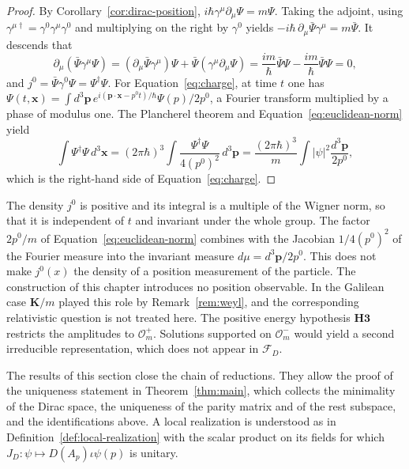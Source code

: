 \begin{proof}
	By Corollary~\ref{cor:dirac-position}, $i\hbar\gamma^\mu\partial_\mu\Psi=m\Psi$. Taking the adjoint, using $\gamma^{\mu\dagger}=\gamma^0\gamma^\mu\gamma^0$ and multiplying on the right by $\gamma^0$ yields $-i\hbar\,\partial_\mu\bar{\Psi}\gamma^\mu=m\bar{\Psi}$. It descends that
	\begin{equation*}
		\partial_\mu(\bar{\Psi}\gamma^\mu\Psi)=(\partial_\mu\bar{\Psi}\gamma^\mu)\Psi+\bar{\Psi}(\gamma^\mu\partial_\mu\Psi)=\frac{im}{\hbar}\bar{\Psi}\Psi-\frac{im}{\hbar}\bar{\Psi}\Psi=0,
	\end{equation*}
	and $j^0=\bar{\Psi}\gamma^0\Psi=\Psi^\dagger\Psi$. For Equation~\eqref{eq:charge}, at time $t$ one has $\Psi(t,\mathbf{x})=\int d^3\mathbf{p}\,e^{i(\mathbf{p}\cdot\mathbf{x}-p^0t)/\hbar}\Psi(p)/2p^0$, a Fourier transform multiplied by a phase of modulus one. The Plancherel theorem \cite[TODO-location]{TODO-RS03} and Equation~\eqref{eq:euclidean-norm} yield
	\begin{equation*}
		\int\Psi^\dagger\Psi\,d^3\mathbf{x}=(2\pi\hbar)^3\int\frac{\Psi^\dagger\Psi}{4(p^0)^2}\,d^3\mathbf{p}=\frac{(2\pi\hbar)^3}{m}\int|\psi|^2\frac{d^3\mathbf{p}}{2p^0},
	\end{equation*}
	which is the right-hand side of Equation~\eqref{eq:charge}.
\end{proof}

\begin{remark}\label{rem:probability-limits}
	The density $j^0$ is positive and its integral is a multiple of the Wigner norm, so that it is independent of $t$ and invariant under the whole group. The factor $2p^0/m$ of Equation~\eqref{eq:euclidean-norm} combines with the Jacobian $1/4(p^0)^2$ of the Fourier measure into the invariant measure $d\mu=d^3\mathbf{p}/2p^0$. This does not make $j^0(x)$ the density of a position measurement of the particle. The construction of this chapter introduces no position observable. In the Galilean case $\mathbf{K}/m$ played this role by Remark~\ref{rem:weyl}, and the corresponding relativistic question is not treated here. The positive energy hypothesis $\mathbf{H3}$ restricts the amplitudes to $\mathcal{O}_m^+$. Solutions supported on $\mathcal{O}_m^-$ would yield a second irreducible representation, which does not appear in $\mathcal{F}_D$.
\end{remark}

The results of this section close the chain of reductions. They allow the proof of the uniqueness statement in Theorem~\ref{thm:main}, which collects the minimality of the Dirac space, the uniqueness of the parity matrix and of the rest subspace, and the identifications above. A local realization is understood as in Definition~\ref{def:local-realization} with the scalar product on its fields for which $J_D:\psi\mapsto D(A_p)\iota\psi(p)$ is unitary.


